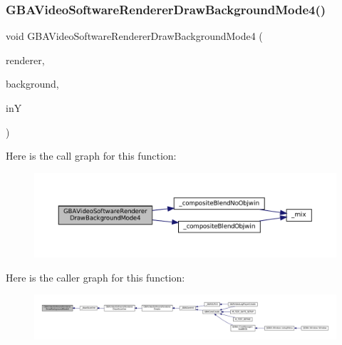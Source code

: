 \subsubsection{\texorpdfstring{G\+B\+A\+Video\+Software\+Renderer\+Draw\+Background\+Mode4()}{GBAVideoSoftwareRendererDrawBackgroundMode4()}}
{\footnotesize\ttfamily void G\+B\+A\+Video\+Software\+Renderer\+Draw\+Background\+Mode4 (\begin{DoxyParamCaption}\item[{struct G\+B\+A\+Video\+Software\+Renderer $\ast$}]{renderer,  }\item[{struct G\+B\+A\+Video\+Software\+Background $\ast$}]{background,  }\item[{\mbox{\hyperlink{ioapi_8h_a787fa3cf048117ba7123753c1e74fcd6}{int}}}]{inY }\end{DoxyParamCaption})}

Here is the call graph for this function\+:
\nopagebreak
\begin{figure}[H]
\begin{center}
\leavevmode
\includegraphics[width=350pt]{software-bg_8c_a405f08b46da4ca30878baab466bd2175_cgraph}
\end{center}
\end{figure}
Here is the caller graph for this function\+:
\nopagebreak
\begin{figure}[H]
\begin{center}
\leavevmode
\includegraphics[width=350pt]{software-bg_8c_a405f08b46da4ca30878baab466bd2175_icgraph}
\end{center}
\end{figure}
\mbox{\label{software-bg_8c_a9d87077d27cf5f313462c78d226d1956}} 
